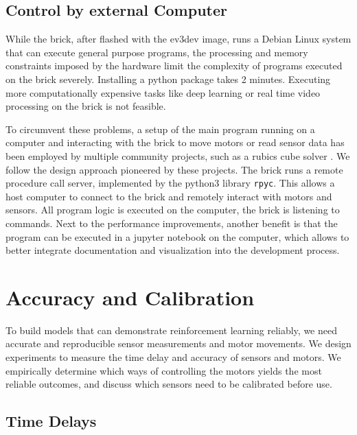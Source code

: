 \documentclass[11pt, a4paper]{article}
\begin{document}
\subsection{Control by external Computer}
While the brick, after flashed with the ev3dev image, runs a Debian Linux system that can execute general purpose programs, the processing and memory constraints imposed by the hardware limit the complexity of programs executed on the brick severely. Installing a python package takes 2 minutes. Executing more computationally expensive tasks like deep learning or real time video processing on the brick is not feasible.

To circumvent these problems, a setup of the main program running on a computer and interacting with the brick to move motors or read sensor data has been employed by multiple community projects, such as a rubics cube solver \cite{ev3_rubics}. We follow the design approach pioneered by these projects. The brick runs a remote procedure call server, implemented by the python3 library \texttt{rpyc}. This allows a host computer to connect to the brick and remotely interact with motors and sensors. All program logic is executed on the computer, the brick is listening to commands. Next to the performance improvements, another benefit is that the program can be executed in a jupyter notebook on the computer, which allows to better integrate documentation and visualization into the development process.

\section{Accuracy and Calibration}
To build models that can demonstrate reinforcement learning reliably, we need accurate and reproducible sensor measurements and motor movements. We design experiments to measure the time delay and accuracy of sensors and motors. We empirically determine which ways of controlling the motors yields the most reliable outcomes, and discuss which sensors need to be calibrated before use. 
\subsection{Time Delays}
\end{document}
